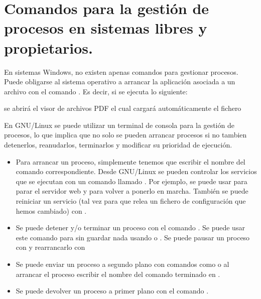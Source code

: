 \documentclass[letterpaper,10pt,spanish]{sphinxmanual}
\begin{document}
\section{Comandos para la gestión de procesos en sistemas libres y propietarios.}
\label{\detokenize{textos/tema1:comandos-para-la-gestion-de-procesos-en-sistemas-libres-y-propietarios}}
En sistemas Windows, no existen apenas comandos para gestionar procesos. Puede obligarse al sistema operativo a arrancar la aplicación asociada a un archivo con el comando . Es decir, si se ejecuta lo siguiente:

%
\begin{sphinxVerbatim}[commandchars=\\\{\}]
 
\end{sphinxVerbatim}

se abrirá el visor de archivos PDF el cual cargará automáticamente el fichero 

En GNU/Linux se puede utilizar un terminal de consola para la gestión de procesos, lo que implica que no solo se pueden arrancar procesos si no tambien detenerlos, reanudarlos, terminarlos y modificar su prioridad de ejecución.
\begin{itemize}
\item {} 
Para arrancar un proceso, simplemente tenemos que escribir el nombre del comando correspondiente. Desde GNU/Linux se pueden controlar los servicios que se ejecutan con un comando llamado . Por ejemplo, se puede usar  para parar el servidor web y  para volver a ponerlo en marcha. También se puede reiniciar un servicio (tal vez para que relea un fichero de configuración que hemos cambiado) con .

\item {} 
Se puede detener y/o terminar un proceso con el comando . Se puede usar este comando para  sin guardar nada usando  o . Se puede pausar un proceso con  y rearrancarlo con 

\item {} 
Se puede enviar un proceso a segundo plano con comandos como  o al arrancar el proceso escribir el nombre del comando terminado en \sphinxcode{\sphinxupquote{\&}}.

\item {} 
Se puede devolver un proceso a primer plano con el comando .

\end{itemize}
\end{document}
